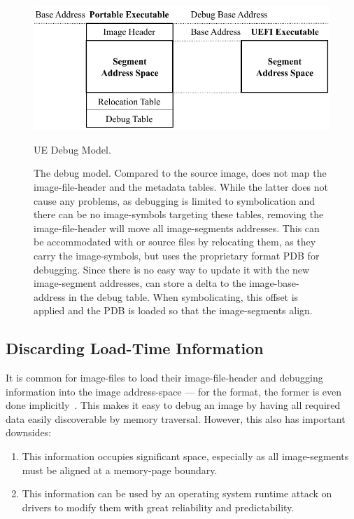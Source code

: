 \begin{figure}[htb]
  \centering
  \includegraphics{Figures/UeDebug.pdf}
  \caption{UE Debug Model.}
  \label{fig:ue_debug}
  \caption*{The  debug model. Compared to the source  \gls{image},  does not map the \gls{image-file-header} and the metadata tables. While the latter does not cause any problems, as debugging is limited to symbolication and there can be no \glspl{image-symbol} targeting these tables, removing the \gls{image-file-header} will move all \glspl{image-segment} addresses. This can be accommodated with  or  source files by relocating them, as they carry the \glspl{image-symbol}, but  uses the proprietary  format \gls{PDB} for debugging. Since there is no easy way to update it with the new \gls{image-segment} addresses,  can store a delta to the \gls{image-base-address} in the debug table. When symbolicating, this offset is applied and the \gls{PDB} is loaded so that the \glspl{image-segment} align.}
\end{figure}

\subsection{Discarding Load-Time Information}
\label{sec:reduce_info}

It is common for \glspl{image-file} to load their \gls{image-file-header} and debugging information into the \gls{image} \gls{address-space} --- for the  format, the former is even done implicitly~\cite{pe-format}. This makes it easy to debug an \gls{image} by having all required data easily discoverable by memory traversal. However, this also has important downsides:
\begin{enumerate}
  \item This information occupies significant space, especially as all \glspl{image-segment} must be aligned at a \gls{memory-page} boundary.
  \item This information can be used by an operating system runtime attack on  drivers to modify them with great reliability and predictability.
\end{enumerate}

